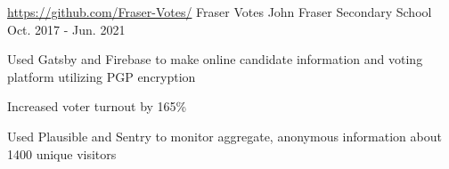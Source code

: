 

\begin{cventries}

  \cventry
    {\url{https://github.com/Fraser-Votes/}} %
    {Fraser Votes} %
    {John Fraser Secondary School} %
    {Oct. 2017 - Jun. 2021} %
    {
      \begin{cvitems} %
		\item {Used Gatsby and Firebase to make online candidate information and voting platform utilizing PGP encryption}
		\item {Increased voter turnout by 165\%}
		\item {Used Plausible and Sentry to monitor aggregate, anonymous information about 1400 unique visitors}
      \end{cvitems}
    }


\end{cventries}
